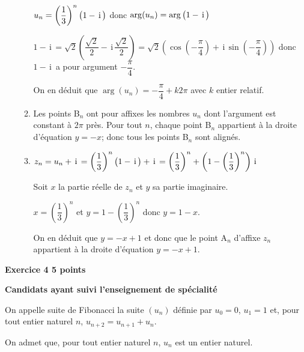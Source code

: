 \documentclass[10pt,a4paper]{article}
\renewcommand{\i}{\mathrm{\,i\,}}%
\newcommand{\ds}{\displaystyle}
\begin{document}
\begin{enumerate}
\begin{enumerate}
$u_n=\left (\dfrac{1}{3}\right )^n\left (1-\i\strut\right )$ donc $\arg(u_n)=\arg\left (1-\i\strut\right )$

$1-\i =\ds\sqrt{2}\left (\dfrac{\ds\sqrt{2}}{2} - \i\dfrac{\ds\sqrt{2}}{2} \right ) =
\ds\sqrt{2} \left ( \cos\left (-\dfrac{\pi}{4}\right ) + \i \sin\left (-\dfrac{\pi}{4}\right )\right )$ donc 
$1-\i$ a pour argument $ -\dfrac{\pi}{4}$.
 
On en déduit que $\arg(u_n)=-\dfrac{\pi}{4} + k2\pi$ avec $k$ entier relatif.

\item%
Les points B$_n$ ont pour affixes les nombres $u_n$ dont l'argument est constant à $2\pi$ près. Pour tout $n$, chaque point B$_n$ appartient à la droite d'équation $y=-x$; donc tous les points B$_n$ sont alignés.

\item%

$z_n=u_n+\i = \left (\dfrac{1}{3}\right )^n \left (1-\i\strut\right ) + \i
= \left (\dfrac{1}{3}\right )^n + \left ( 1-\left( \dfrac{1}{3}\right )^n\right  ) \i$

Soit $x$ la partie réelle de $z_n$ et $y$ sa partie imaginaire.

$x=\left (\dfrac{1}{3}\right )^n$ et $y=1-\left (\dfrac{1}{3}\right )^n$ donc $y=1-x$.

On en déduit que $y=-x+1$ et donc que le point A$_n$ d'affixe $z_n$ appartient à la droite d'équation $y=-x+1$.

\end{enumerate}
\end{enumerate}

\vspace{0,5cm}

\textbf{Exercice 4 \hfill 5 points}

\medskip

\textbf{Candidats ayant suivi l'enseignement de spécialité}

\bigskip

On appelle suite de Fibonacci la suite $(u_n)$ définie par $u_0=0$, $u_1=1$ et, pour tout entier naturel $n$,
$u_{n+2} = u_{n+1} + u_{n}.$

On admet que, pour tout entier naturel $n$, $u_n$ est un entier naturel.

%
\end{document}
